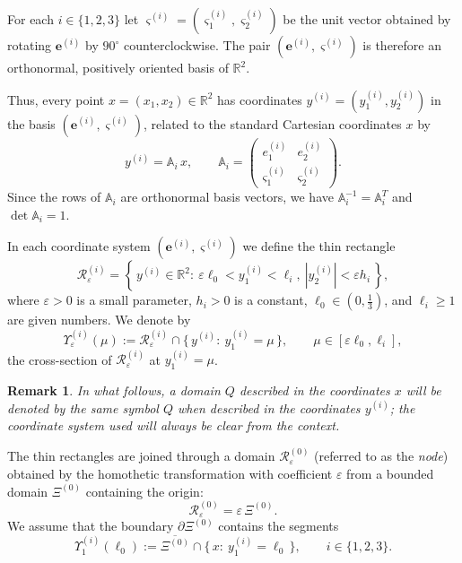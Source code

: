 \documentclass[reqno]{amsart}            %
\newtheorem{remark}{Remark}[section]
\numberwithin{equation}{section}
\begin{document}
	For each $i\in\{1,2,3\}$ let
	$\boldsymbol{\varsigma}^{(i)}=(\varsigma_1^{(i)},\varsigma_2^{(i)})$
	be the unit vector obtained by rotating $\mathbf{e}^{(i)}$ by $90^\circ$
	counterclockwise. The pair $(\mathbf{e}^{(i)},\boldsymbol{\varsigma}^{(i)})$
	is therefore an orthonormal, positively oriented basis of $\mathbb{R}^2$.
	
	Thus, every point $x=(x_1,x_2)\in\mathbb{R}^2$ has coordinates
	$y^{(i)}=(y_1^{(i)},y_2^{(i)})$ in the basis
	$(\mathbf{e}^{(i)},\boldsymbol{\varsigma}^{(i)})$, related to the standard
	Cartesian coordinates $x$ by
	\begin{equation}\label{matrix}
		y^{(i)}=\mathbb{A}_i\,x,
		\qquad
		\mathbb{A}_i=\begin{pmatrix}
			e_1^{(i)} & e_2^{(i)}
			\\[4pt]
			\varsigma_1^{(i)} & \varsigma_2^{(i)}
		\end{pmatrix}.
	\end{equation}
	Since the rows of $\mathbb{A}_i$ are orthonormal basis vectors, we have
	$\mathbb{A}_i^{-1}=\mathbb{A}_i^{T}$ and $\det\mathbb{A}_i=1$.
	
	In each coordinate system $(\mathbf{e}^{(i)},\boldsymbol{\varsigma}^{(i)})$
	we define the thin rectangle
	\[
	\mathcal{R}_\varepsilon^{(i)}
	=\left\{\,y^{(i)}\in\mathbb{R}^2:\ 
	\varepsilon\ell_0<y_1^{(i)}<\ell_i,\ 
	|y_2^{(i)}|<\varepsilon h_i\,\right\},
	\]
	where $\varepsilon>0$ is a small parameter, $h_i>0$ is a constant,
	$\ell_0\in(0,\tfrac{1}{3})$, and $\ell_i\ge1$ are given numbers. We denote by
	\[
	\Upsilon_\varepsilon^{(i)}(\mu)
	:=\mathcal{R}_\varepsilon^{(i)}\cap
	\{\,y^{(i)}:\ y_1^{(i)}=\mu\,\},
	\qquad
	\mu\in[\varepsilon\ell_0,\ell_i],
	\]
	the cross-section of $\mathcal{R}_\varepsilon^{(i)}$ at $y_1^{(i)}=\mu$.
	
	\begin{remark}
		In what follows, a domain $Q$ described in the coordinates $x$ will be
		denoted by the same symbol $Q$ when described in the coordinates $y^{(i)}$;
		the coordinate system used will always be clear from the context.
	\end{remark}
	
	The thin rectangles are joined through a domain $\mathcal{R}_\varepsilon^{(0)}$
	(referred to as the \emph{node}) obtained by the homothetic transformation
	with coefficient $\varepsilon$ from a bounded domain $\Xi^{(0)}$ containing
	the origin:
	\begin{equation}\label{node}
		\mathcal{R}_\varepsilon^{(0)}=\varepsilon\,\Xi^{(0)}.
	\end{equation}
	We assume that the boundary $\partial\Xi^{(0)}$ contains the segments
	\[
	\Upsilon^{(i)}_1(\ell_0)
	:=\overline{\Xi^{(0)}}\cap\{\,x:\ y_1^{(i)}=\ell_0\,\},
	\qquad i\in\{1,2,3\}.
	\]
	
\end{document}
